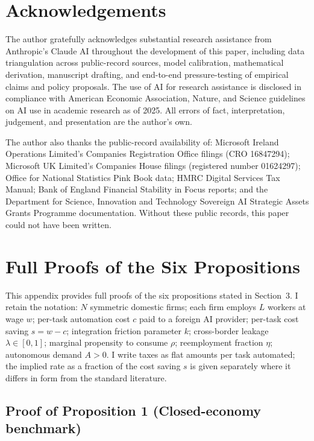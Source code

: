 \documentclass[11pt,letterpaper]{article}
\theoremstyle{remark}
\begin{document}
\section*{Acknowledgements}

The author gratefully acknowledges substantial research assistance from Anthropic's Claude AI throughout the development of this paper, including data triangulation across public-record sources, model calibration, mathematical derivation, manuscript drafting, and end-to-end pressure-testing of empirical claims and policy proposals. The use of AI for research assistance is disclosed in compliance with American Economic Association, Nature, and Science guidelines on AI use in academic research as of 2025. All errors of fact, interpretation, judgement, and presentation are the author's own.

The author also thanks the public-record availability of: Microsoft Ireland Operations Limited's Companies Registration Office filings (CRO 16847294); Microsoft UK Limited's Companies House filings (registered number 01624297); Office for National Statistics Pink Book data; HMRC Digital Services Tax Manual; Bank of England Financial Stability in Focus reports; and the Department for Science, Innovation and Technology Sovereign AI Strategic Assets Grants Programme documentation. Without these public records, this paper could not have been written.

\appendix

\section{Full Proofs of the Six Propositions}

This appendix provides full proofs of the six propositions stated in Section~3. I retain the notation: $N$ symmetric domestic firms; each firm employs $L$ workers at wage $w$; per-task automation cost $c$ paid to a foreign AI provider; per-task cost saving $s = w - c$; integration friction parameter $k$; cross-border leakage $\lambda \in [0, 1]$; marginal propensity to consume $\rho$; reemployment fraction $\eta$; autonomous demand $A > 0$. I write taxes as flat amounts per task automated; the implied rate as a fraction of the cost saving $s$ is given separately where it differs in form from the standard literature.

\subsection*{Proof of Proposition 1 (Closed-economy benchmark)}
\end{document}
